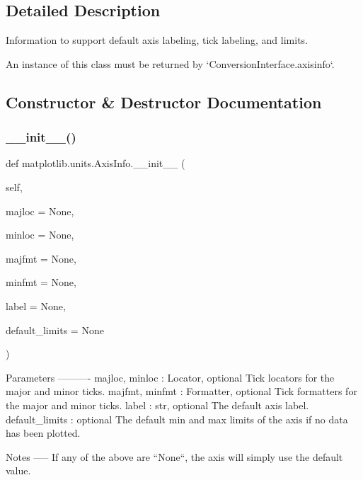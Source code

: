 \subsection{Detailed Description}
\begin{DoxyVerb}Information to support default axis labeling, tick labeling, and limits.

An instance of this class must be returned by
`ConversionInterface.axisinfo`.
\end{DoxyVerb}
 

\subsection{Constructor \& Destructor Documentation}
\mbox{\label{classmatplotlib_1_1units_1_1AxisInfo_a0180db004390ffd043ac931053bad0c1}} 
\subsubsection{\texorpdfstring{\+\_\+\+\_\+init\+\_\+\+\_\+()}{\_\_init\_\_()}}
{\footnotesize\ttfamily def matplotlib.\+units.\+Axis\+Info.\+\_\+\+\_\+init\+\_\+\+\_\+ (\begin{DoxyParamCaption}\item[{}]{self,  }\item[{}]{majloc = {\ttfamily None},  }\item[{}]{minloc = {\ttfamily None},  }\item[{}]{majfmt = {\ttfamily None},  }\item[{}]{minfmt = {\ttfamily None},  }\item[{}]{label = {\ttfamily None},  }\item[{}]{default\+\_\+limits = {\ttfamily None} }\end{DoxyParamCaption})}

\begin{DoxyVerb}Parameters
----------
majloc, minloc : Locator, optional
    Tick locators for the major and minor ticks.
majfmt, minfmt : Formatter, optional
    Tick formatters for the major and minor ticks.
label : str, optional
    The default axis label.
default_limits : optional
    The default min and max limits of the axis if no data has
    been plotted.

Notes
-----
If any of the above are ``None``, the axis will simply use the
default value.
\end{DoxyVerb}
 

